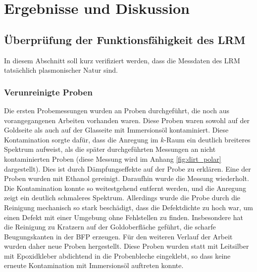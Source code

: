 \documentclass[titlepage,  ngerman]{article}
\begin{document}
	\section{Ergebnisse und Diskussion}
	
	\subsection{Überprüfung der Funktionsfähigkeit des LRM}
	In diesem Abschnitt soll kurz verifiziert werden, dass die Messdaten des LRM tatsächlich plasmonischer Natur sind.
	\subsubsection{Verunreinigte Proben}
	Die ersten Probemessungen wurden an Proben durchgeführt, die noch aus vorangegangenen Arbeiten vorhanden waren. Diese Proben waren sowohl auf der Goldseite als auch auf der Glasseite mit Immersionsöl kontaminiert. Diese Kontamination sorgte dafür, dass die Anregung im $k$-Raum ein deutlich breiteres Spektrum aufweist, als die später durchgeführten Messungen an nicht kontaminierten Proben (diese Messung wird im Anhang \ref{fig:dirt_polar} dargestellt). Dies ist durch Dämpfungseffekte auf der Probe zu erklären. Eine der Proben wurden mit Ethanol gereinigt. Daraufhin wurde die Messung wiederholt. Die Kontamination konnte so weitestgehend entfernt werden, und die Anregung zeigt ein deutlich schmaleres Spektrum. Allerdings wurde die Probe durch die Reinigung mechanisch so stark beschädigt, dass die Defektdichte zu hoch war, um einen Defekt mit einer Umgebung ohne Fehlstellen zu finden. Insbesondere hat die Reinigung zu Kratzern auf der Goldoberfläche geführt, die scharfe Beugungskanten in der BFP  erzeugen. Für den weiteren Verlauf der Arbeit wurden daher neue Proben hergestellt. Diese Proben wurden statt mit Leitsilber mit Epoxidkleber abdichtend in die Probenbleche eingeklebt, so dass keine erneute Kontamination mit Immersionsöl auftreten konnte.
\end{document}
